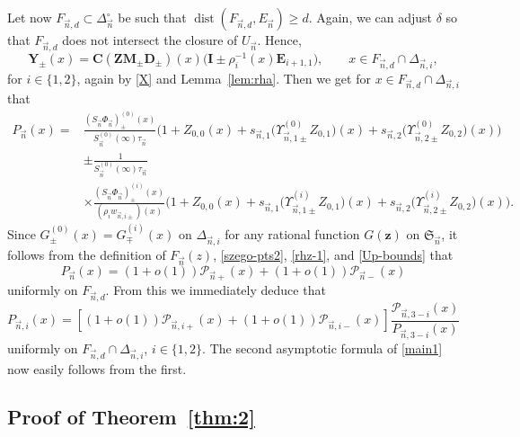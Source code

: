 \documentclass[10pt,a4paper]{amsart}
\numberwithin{equation}{section}
\newcommand{\dist}{\operatorname{dist}}
\newcommand{\n}{{\vec n}}
\newcommand{\RS}{\boldsymbol{\mathfrak{S}}}
\newcommand{\z}	{{\boldsymbol z}}
\begin{document}
Let now $ F_{\n,d} \subset\Delta_\n^\circ $ be such that $ \dist(F_{\n,d},E_\n)\geq d$. Again, we can adjust $ \delta $ so that $ F_{\n,d} $ does not intersect the closure of $ U_\n $. Hence,
\begin{equation}
\label{Y2}
\boldsymbol Y_{\pm}(x) = \boldsymbol C (\boldsymbol{ZM}_{\pm}\boldsymbol D_{\pm})(x)\bigl(\boldsymbol I \pm \rho_i^{-1}(x) \boldsymbol E_{i+1,1} \bigr), \qquad x\in F_{\n,d}\cap\Delta_{\n,i},
\end{equation}
for $ i\in\{1,2\} $, again by \eqref{X} and Lemma~\ref{lem:rha}. Then we get for $ x\in F_{\n,d} \cap \Delta_{\n,i} $ that
\begin{align*}
P_\n(x) = {}&\frac{(S_\n\Phi_\n)_\pm^{(0)}(x)}{S_\n^{(0)}(\infty) \tau_\n} \bigl(1+Z_{0,0}(x) + s_{\n,1} \bigl(\Upsilon_{\n,1\pm}^{(0)}Z_{0,1}\bigr)(x) + s_{\n,2}\bigl(\Upsilon_{\n,2\pm}^{(0)}Z_{0,2}\bigr)(x) \bigr) \\
 &\pm\frac1{S_\n^{(0)}(\infty) \tau_\n} \\
 &\times\frac{(S_\n\Phi_\n)_\pm^{(i)}(x)}{(\rho_iw_{\n,i\pm})(x)}\bigl(1+Z_{0,0}(x) + s_{\n,1} \bigl(\Upsilon_{\n,1\pm}^{(i)}Z_{0,1}\bigr)(x) + s_{\n,2}\bigl(\Upsilon_{\n,2\pm}^{(i)}Z_{0,2}\bigr)(x) \bigr).
\end{align*}
Since $ G^{(0)}_\pm(x) = G^{(i)}_\mp(x) $ on $ \Delta_{\n,i} $ for any rational function $ G(\z) $ on $ \RS_\n $, it follows from the definition of $ F_\n(z) $, \eqref{szego-pts2}, \eqref{rhz-1}, and \eqref{Up-bounds} that
\[
P_\n(x) = (1+ o(1)) \mathcal P_{\n+}(x) + (1+ o(1)) \mathcal P_{\n-}(x)
\]
uniformly on $ F_{\n,d} $. From this we immediately deduce that
\[
P_{\n,i}(x) = \left[ (1+ o(1)) \mathcal P_{\n,i+}(x) + (1+ o(1)) \mathcal P_{\n,i-}(x) \right] \frac{\mathcal P_{\n,3-i}(x)}{P_{\n,3-i}(x)}
\]
uniformly on $ F_{\n,d}\cap\Delta_{\n,i} $, $ i\in\{1,2\} $. The second asymptotic formula of \eqref{main1} now easily follows from the first.

\subsection[Proof of Theorem 1.6]{Proof of Theorem~\ref{thm:2}}
\end{document}
